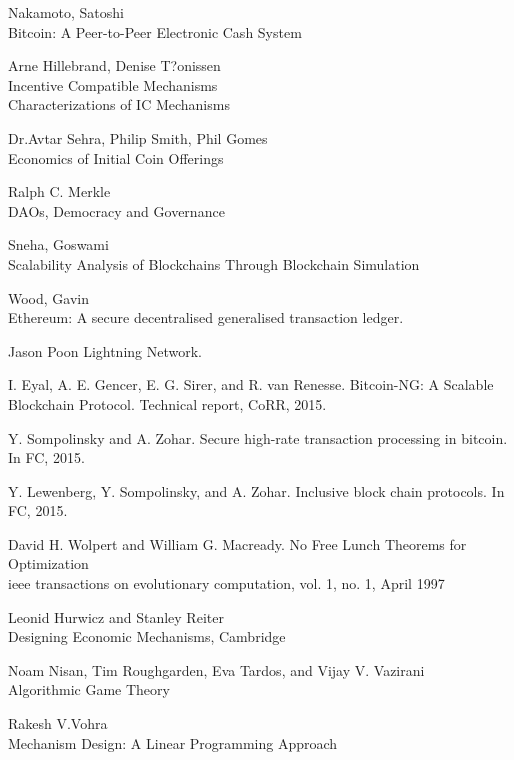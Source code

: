 \documentclass[12pt, titlepage, twocolumn]{report}
\begin{document}
\begin{thebibliography}{20}

Nakamoto, Satoshi \\
Bitcoin: A Peer-to-Peer Electronic Cash System

 Arne Hillebrand, Denise T?onissen \\
Incentive Compatible Mechanisms \\ 
Characterizations of IC Mechanisms

 Dr.Avtar Sehra, Philip Smith, Phil Gomes\\
Economics of Initial Coin Offerings

  Ralph C. Merkle\\
DAOs, Democracy and Governance

 Sneha, Goswami \\
Scalability Analysis of Blockchains Through Blockchain Simulation

 Wood, Gavin \\
Ethereum: A secure decentralised generalised transaction ledger.

 Jason Poon
Lightning Network.

 I. Eyal, A. E. Gencer, E. G. Sirer, and R. van Renesse. Bitcoin-NG: A Scalable \\
Blockchain Protocol. Technical report, CoRR, 2015.

 Y. Sompolinsky and A. Zohar. Secure high-rate transaction processing in bitcoin.
In FC, 2015.


 Y. Lewenberg, Y. Sompolinsky, and A. Zohar. Inclusive block chain protocols. In
FC, 2015.

David H. Wolpert and William G. Macready. No Free Lunch Theorems for Optimization \\
ieee transactions on evolutionary computation, vol. 1, no. 1, April 1997

Leonid Hurwicz and Stanley Reiter \\
Designing Economic Mechanisms, Cambridge

Noam Nisan, Tim Roughgarden, Eva Tardos, and Vijay V. Vazirani \\
Algorithmic Game Theory

 Rakesh V.Vohra \\
Mechanism Design: A Linear Programming Approach


\end{thebibliography}
\end{document}
